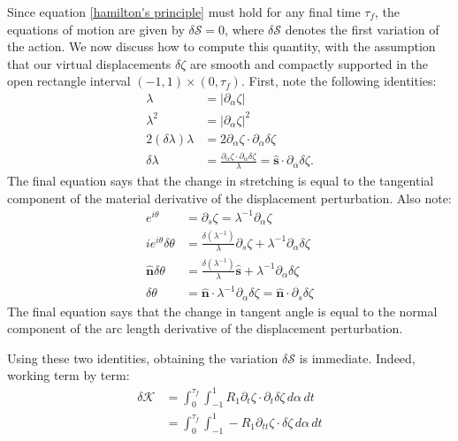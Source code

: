 \documentclass{article}[12pt]
\theoremstyle{Theorem}
\begin{document}
Since equation \eqref{hamilton's principle} must hold for any final time $\tau_f$, the equations of motion are given by $\delta \mathcal{S} = 0$, where $\delta\mathcal{S}$ denotes the first variation of the action. We now discuss how to compute this quantity, with the assumption that our virtual displacements $\delta\zeta$ are smooth and compactly supported in the open rectangle interval $(-1,1)\times(0,\tau_f)$. First, note the following identities: 
\begin{align}
    \lambda &= |\partial_\alpha\zeta| \\
    \lambda^2 &= |\partial_\alpha\zeta|^2 \\
    2(\delta\lambda)\lambda &= 2\partial_\alpha\zeta\cdot\partial_\alpha\delta\zeta \\ 
    \delta\lambda &= \frac{\partial_\alpha\zeta\cdot\partial_\alpha\delta\zeta}{\lambda} = \hat{\boldsymbol{s}}\cdot\partial_\alpha\delta\zeta.
\end{align}
The final equation says that the change in stretching is equal to the tangential component of the material derivative of the displacement perturbation. Also note:
\begin{align}
    e^{i\theta} &= \partial_s\zeta = \lambda^{-1}\partial_\alpha\zeta \\
    ie^{i\theta}\delta\theta &= \frac{\delta(\lambda^{-1})}{\lambda}\partial_s\zeta + \lambda^{-1}\partial_\alpha\delta\zeta \\
    \hat{\boldsymbol{n}}\delta\theta &= \frac{\delta(\lambda^{-1})}{\lambda}\hat{\boldsymbol{s}} + \lambda^{-1}\partial_\alpha\delta\zeta \\ 
    \delta\theta &= \hat{\boldsymbol{n}} \cdot\lambda^{-1}\partial_\alpha\delta\zeta =  \hat{\boldsymbol{n}} \cdot\partial_s\delta\zeta
\end{align}
The final equation says that the change in tangent angle is equal to the normal component of the arc length derivative of the displacement perturbation.
\newline 

Using these two identities, obtaining the variation $\delta\mathcal{S}$ is immediate. Indeed, working term by term: 
\begin{align}
    \delta\mathcal{K} &= \int_0^{\tau_f}\int_{-1}^1R_1\partial_t\zeta\cdot\partial_t\delta\zeta\,d\alpha\, dt \\ 
    &= \int_0^{\tau_f}\int_{-1}^1-R_1\partial_{tt}\zeta\cdot\delta\zeta\,d\alpha\, dt
\end{align}
\end{document}
